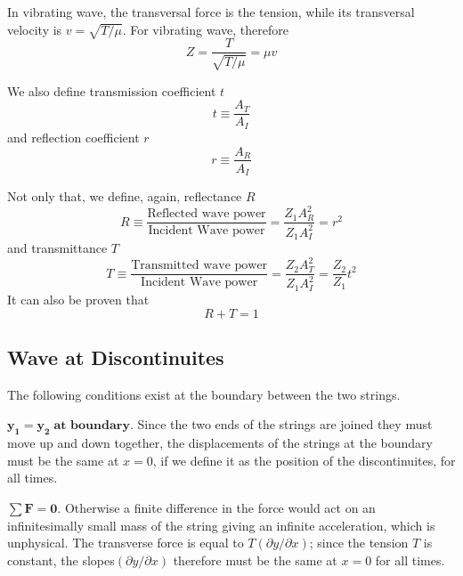 \documentclass[../../../main.tex]{subfiles}
\begin{document}
In vibrating wave, the transversal force is the tension, while its transversal velocity is $v=\sqrt{T/\mu}$. For vibrating wave, therefore
\begin{equation*}
    Z=\frac{T}{\sqrt{T/\mu}}=\mu v
\end{equation*}

We also define transmission coefficient $t$ 
\begin{equation*}
    t\equiv\frac{A_T}{A_I}
\end{equation*}
and reflection coefficient $r$
\begin{equation*}
    r\equiv\frac{A_R}{A_I}
\end{equation*}

Not only that, we define, again, reflectance $R$
\begin{equation*}
    R\equiv\frac{\text{Reflected wave power}}{\text{Incident Wave power}}=\frac{Z_1A_R^2}{Z_1A_I^2}=r^2
\end{equation*} 
and transmittance $T$
\begin{equation*}
    T\equiv\frac{\text{Transmitted wave power}}{\text{Incident Wave power}}=\frac{Z_2A_T^2}{Z_1A_I^2}=\frac{Z_2}{Z_1}t^2
\end{equation*}
It can also be proven that
\begin{equation*}
    R+T=1
\end{equation*}

\subsection*{Wave at Discontinuites}
The following conditions exist at the boundary between the two strings.

$\mathbf{y_1=y_2\; \textbf{at boundary}.}$ Since the two ends of the strings are joined they must move up and down together, the displacements of the strings at the boundary must be the same at $x = 0$, if we define it as the position of the discontinuites, for all times. 

$\mathbf{\sum F=0.}$ Otherwise a finite difference in the force would act on an infinitesimally small mass of the string giving an infinite acceleration, which is unphysical. The transverse force is equal to $T (\partial y/\partial x)$; since the tension $T$ is constant, the slopes$ (\partial y/\partial x)$ therefore must be the same at $x = 0$ for all times.
\end{document}
